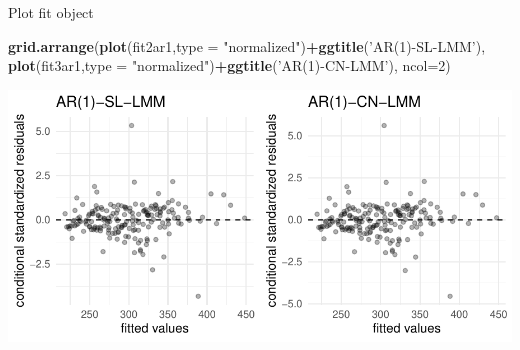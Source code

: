 \documentclass[
  ignorenonframetext,
]{beamer}
\newenvironment{Shaded}{\begin{snugshade}}{\end{snugshade}}
\newcommand{\DataTypeTok}[1]{\textcolor[rgb]{0.13,0.29,0.53}{#1}}
\newcommand{\DecValTok}[1]{\textcolor[rgb]{0.00,0.00,0.81}{#1}}
\newcommand{\KeywordTok}[1]{\textcolor[rgb]{0.13,0.29,0.53}{\textbf{#1}}}
\newcommand{\NormalTok}[1]{#1}
\newcommand{\OperatorTok}[1]{\textcolor[rgb]{0.81,0.36,0.00}{\textbf{#1}}}
\newcommand{\StringTok}[1]{\textcolor[rgb]{0.31,0.60,0.02}{#1}}
\begin{document}
\begin{frame}[fragile]{Plot fit object}
\protect\hypertarget{plot-fit-object}{}

\scriptsize

\begin{Shaded}
\begin{Highlighting}[]
\KeywordTok{grid.arrange}\NormalTok{(}\KeywordTok{plot}\NormalTok{(fit2ar1,}\DataTypeTok{type =} \StringTok{"normalized"}\NormalTok{)}\OperatorTok{+}\KeywordTok{ggtitle}\NormalTok{(}\StringTok{'AR(1)-SL-LMM'}\NormalTok{),}
             \KeywordTok{plot}\NormalTok{(fit3ar1,}\DataTypeTok{type =} \StringTok{"normalized"}\NormalTok{)}\OperatorTok{+}\KeywordTok{ggtitle}\NormalTok{(}\StringTok{'AR(1)-CN-LMM'}\NormalTok{),}
             \DataTypeTok{ncol=}\DecValTok{2}\NormalTok{)}
\end{Highlighting}
\end{Shaded}

\begin{center}\includegraphics[width=0.85\linewidth]{codes_files/figure-beamer/extra1-1} \end{center}

\end{frame}
\end{document}
